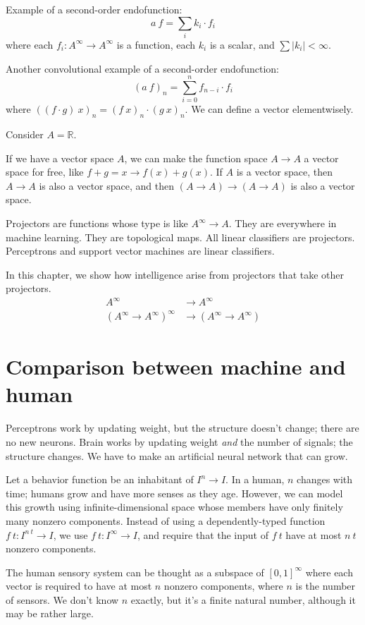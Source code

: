 Example of a second-order endofunction:
\[
    a~f = \sum_i k_i \cdot f_i
\]
where each \(f_i : A^\infty \to A^\infty\) is a function,
each \(k_i\) is a scalar, and \( \sum |k_i| < \infty \).

Another convolutional example of a second-order endofunction:
\[
    (a~f)_n = \sum_{i=0}^n f_{n-i} \cdot f_i
\]
where \(((f \cdot g)~x)_n = (f~x)_n \cdot (g~x)_n\).
We can define a vector elementwisely.

Consider \(A = \mathbb{R}\).

If we have a vector space \(A\),
we can make the function space \(A \to A\) a vector space for free,
like \(f + g = x \to f(x) + g(x)\).
If \(A\) is a vector space, then \(A \to A\) is also a vector space,
and then \((A \to A) \to (A \to A)\) is also a vector space.

Projectors are functions whose type is like \(A^\infty \to A\).
They are everywhere in machine learning.
They are topological maps.
All linear classifiers are projectors.
Perceptrons and support vector machines are linear classifiers.

In this chapter, we show how intelligence arise
from projectors that take other projectors.
\begin{align*}
    A^\infty &\to A^\infty
    \\
    (A^\infty \to A^\infty)^\infty &\to (A^\infty \to A^\infty)
\end{align*}

\section{Comparison between machine and human}

Perceptrons work by updating weight, but the structure doesn't change;
there are no new neurons.
Brain works by updating weight \emph{and} the number of signals;
the structure changes.
We have to make an artificial neural network that can grow.

Let a behavior function be an inhabitant of \(I^n \to I\).
In a human, \(n\) changes with time;
humans grow and have more senses as they age.
However, we can model this growth
using infinite-dimensional space whose
members have only finitely many nonzero components.
Instead of using a dependently-typed function \(f~t : I^{n~t} \to I\),
we use \(f~t : I^\infty \to I\),
and require that the input of \(f~t\) have at most \(n~t\) nonzero components.

The human sensory system can be thought as a subspace
of \([0,1]^\infty\) where each vector
is required to have at most \(n\) nonzero components,
where \(n\) is the number of sensors.
We don't know \(n\) exactly,
but it's a finite natural number,
although it may be rather large.

